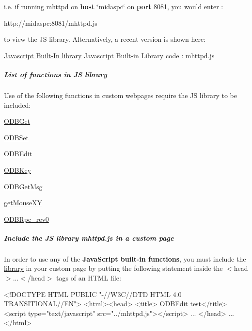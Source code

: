 i.e. if running mhttpd on {\bfseries host} \char`\"{}midaspc\char`\"{} on {\bfseries port} 8081, you would enter : 
\begin{DoxyCode}
http://midaspc:8081/mhttpd.js
\end{DoxyCode}
 to view the JS library. Alternatively, a recent version is shown here:
\begin{DoxyItemize}
\item \hyperlink{RC_mhttpd_js}{Javascript Built-\/In library} Javascript Built-\/in Library code : mhttpd.js
\end{DoxyItemize}

\par


 \hypertarget{RC_mhttpd_custom_js_lib_RC_mhttpd_js_library_features}{}\subparagraph{List of functions in JS library}\label{RC_mhttpd_custom_js_lib_RC_mhttpd_js_library_features}
Use of the following functions in custom webpages require the JS library to be included:
\begin{DoxyItemize}
\item \hyperlink{RC_mhttpd_custom_ODB_access_RC_mhttpd_custom_odbget}{ODBGet}
\item \hyperlink{RC_mhttpd_custom_ODB_access_RC_mhttpd_custom_odbset}{ODBSet}
\item \hyperlink{RC_mhttpd_custom_ODB_access_RC_mhttpd_custom_odbedit}{ODBEdit}
\item \hyperlink{RC_mhttpd_custom_ODB_access_RC_mhttpd_custom_odbkey}{ODBKey}
\item \hyperlink{RC_mhttpd_custom_features_RC_mhttpd_custom_getmsg}{ODBGetMsg}
\item \hyperlink{RC_mhttpd_Image_access_RC_mhttpd_custom_getmouse}{getMouseXY}
\item \hyperlink{RC_mhttpd_custom_RPC_access}{ODBRpc\_\-rev0}
\end{DoxyItemize}



 \hypertarget{RC_mhttpd_custom_js_lib_RC_mhttpd_include_js_library}{}\subparagraph{Include the JS library mhttpd.js in a custom page}\label{RC_mhttpd_custom_js_lib_RC_mhttpd_include_js_library}
In order to use any of the {\bfseries  JavaScript built-\/in functions}, you must include the \hyperlink{RC_mhttpd_custom_js_lib}{library} in your custom page by putting the following statement inside the $<$head$>$...$<$/head$>$ tags of an HTML file:


\begin{DoxyCode}
<!DOCTYPE HTML PUBLIC "-//W3C//DTD HTML 4.0 TRANSITIONAL//EN">
<html><head>
<title> ODBEdit test</title>
<script type="text/javascript" src="../mhttpd.js"></script>
...
</head>
...
</html>
\end{DoxyCode}



